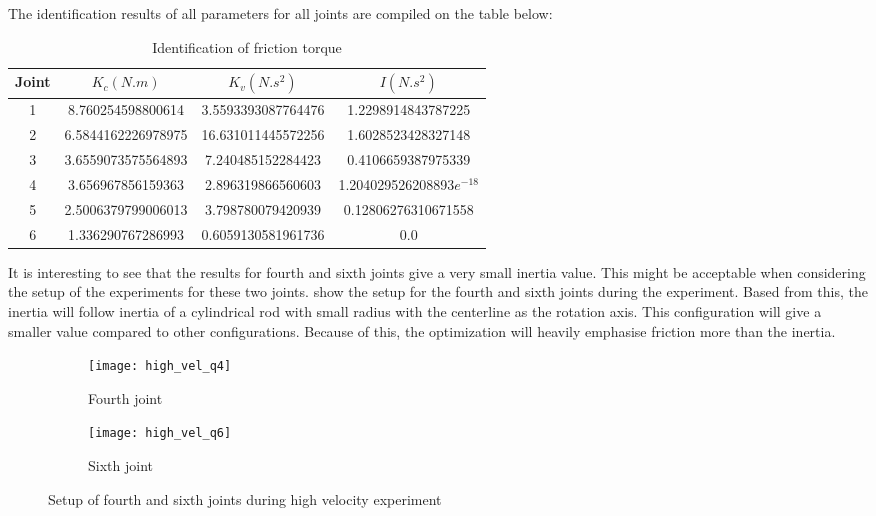 The identification results of all parameters for all joints are compiled on the table below: 
\begin{table}[H]
    \centering
    \begin{tabular}{| c | c | c | c |}
    \hline
    Joint & $K_{c}(N.m)$ & $K_{v} (N.s^{2})$ & $I (N.s^{2})$ \\ \hline
    1 & 8.760254598800614   & 3.5593393087764476  & 1.2298914843787225        \\ \hline
    2 & 6.5844162226978975  & 16.631011445572256  & 1.6028523428327148        \\ \hline
    3 & 3.6559073575564893  & 7.240485152284423   & 0.4106659387975339        \\ \hline
    4 & 3.656967856159363   & 2.896319866560603   & 1.204029526208893$e^{-18}$\\ \hline
    5 & 2.5006379799006013  & 3.798780079420939   & 0.12806276310671558       \\ \hline
    6 & 1.336290767286993   & 0.6059130581961736  & 0.0                       \\ \hline
    \end{tabular}
    \caption{Identification of friction torque}
    \label{table:friction}
\end{table}

It is interesting to see that the results for fourth and sixth joints give a very small inertia value. This might be acceptable when considering the setup of the experiments for these two joints.  show the setup for the fourth and sixth joints during the experiment. Based from this, the inertia will follow inertia of a cylindrical rod with small radius with the centerline as the rotation axis. This configuration will give a smaller value compared to other configurations. Because of this, the optimization will heavily emphasise friction more than the inertia.  

\begin{figure}[H]
  \begin{subfigure}[t]{0.5\textwidth}
    \centering
    \texttt{[image: high\_vel\_q4]} 
    \caption{Fourth joint}
  \end{subfigure}
  \begin{subfigure}[t]{0.5\textwidth}
    \centering
    \texttt{[image: high\_vel\_q6]}
    \caption{Sixth joint}
  \end{subfigure}
  \caption{Setup of fourth and sixth joints during high velocity experiment}
  \label{fig:joint fric setup}
\end{figure}
